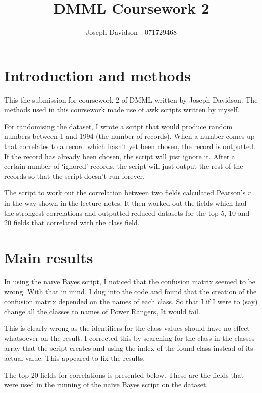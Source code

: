 \documentclass[a4paper,10pt]{article}
\title{DMML Coursework 2}
\author{Joseph Davidson - 071729468}
\date{}
\begin{document}
  \maketitle
  \section{Introduction and methods}
    This the submission for coursework 2 of DMML written by Joseph Davidson. 
    The methods used in this coursework made use of awk scripts written by myself.

    For randomising the dataset, I wrote a script that would produce random numbers
    between 1 and 1994 (the number of records). When a number comes up that correlates to
    a record which hasn't yet been chosen, the record is outputted. If the record has already
    been chosen, the script will just ignore it. After a certain number of `ignored' records, the
    script will just output the rest of the records so that the script doesn't run forever.

    The script to work out the correlation between two fields calculated Pearson's $r$ in the way shown
    in the lecture notes. It then worked out the fields which had the strongest correlations and outputted
    reduced datasets for the top 5, 10 and 20 fields that correlated with the class field.

  \section{Main results}
    In using the na\"{i}ve Bayes script, I noticed that the confusion matrix seemed to be wrong. With that
    in mind, I dug into the code and found that the creation of the confusion matrix depended on the names of
    each class. So that I if I were to (say) change all the classes to names of Power Rangers, It would fail.
    
    This is clearly wrong as the identifiers for the class values should have no effect whatsoever on the result.
    I corrected this by searching for the class in the classes array that the script creates and using the
    index of the found class instead of its actual value. This appeared to fix the results.

    The top 20 fields for correlations is presented below. These are the fields that were used in the running of the na\"{i}ve
    Bayes script on the dataset. 
\end{document}
